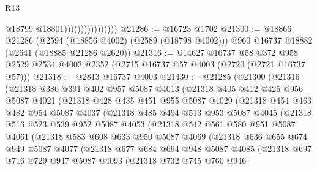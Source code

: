 \begin{lexlean}{R13}
\begin{coremodule}
                                    @18799
                                    @18801))))))))))))))))
@21286 := @16723 @1702
@21300 := @18866
    @21286
    (@2594 (@18856 @4002) (@2589 (@18798 @4002)))
    @960
    @16737
    @18882
    (@2641 (@18885 @21286 @2620))
@21316 := @14627
    @16737
    @58
    @372
    @958
    @2529
    @2534
    @4003
    @2352
    (@2715 @16737 @57 @4003 (@2720 (@2721 @16737 @57)))
@21318 := @2813 @16737 @4003
@21430 := @21285
    (@21300
      (@21316
        (@21318
          @386
          @391
          @402
          @957
          @5087
          @4013
          (@21318
            @405
            @412
            @425
            @956
            @5087
            @4021
            (@21318
              @428
              @435
              @451
              @955
              @5087
              @4029
              (@21318
                @454
                @463
                @482
                @954
                @5087
                @4037
                (@21318
                  @485
                  @494
                  @513
                  @953
                  @5087
                  @4045
                  (@21318
                    @516
                    @523
                    @539
                    @952
                    @5087
                    @4053
                    (@21318
                      @542
                      @561
                      @580
                      @951
                      @5087
                      @4061
                      (@21318
                        @583
                        @608
                        @633
                        @950
                        @5087
                        @4069
                        (@21318
                          @636
                          @655
                          @674
                          @949
                          @5087
                          @4077
                          (@21318
                            @677
                            @684
                            @694
                            @948
                            @5087
                            @4085
                            (@21318
                              @697
                              @716
                              @729
                              @947
                              @5087
                              @4093
                              (@21318
                                @732
                                @745
                                @760
                                @946

\end{coremodule}
\end{lexlean}
